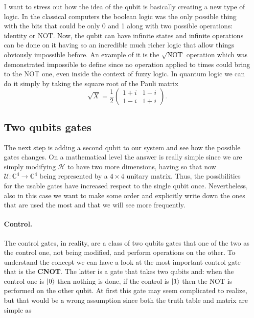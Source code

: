 \nt
{
    I want to stress out how the idea of the qubit is basically creating a new type of logic. In the classical computers the boolean logic was the only possible thing with the bits that could be only 0 and 1 along with two possible operations: identity or NOT. Now, the qubit can have infinite states and infinite operations can be done on it having so an incredible much richer logic that allow things obviously impossible before. An example of it is the $\sqrt{\text{NOT}}$ operation which was demonstrated impossible to define since no operation applied to times could bring to the NOT one, even inside the context of fuzzy logic. In quantum logic we can do it simply by taking the square root of the Pauli matrix
    \begin{equation}
        \sqrt{X} = \frac{1}{2}\begin{pmatrix}
            1+i & 1-i\\
            1-i & 1+i
        \end{pmatrix}.
    \end{equation}
}

\subsection{Two qubits gates}

The next step is adding a second qubit to our system and see how the possible gates changes. On a mathematical level the answer is really simple since we are simply modifying $\mathcal{H}$ to have two more dimensions, having so that now $\mathcal{U}: \mathbb{C}^{4}\to\mathbb{C}^4$ being represented by a $4\times 4$ unitary matrix. Thus, the possibilities for the usable gates have increased respect to the single qubit once. Nevertheless, also in this case we want to make some order and explicitly write down the ones that are used the most and that we will see more frequently.

\paragraph{Control.} The control gates, in reality, are a class of two qubits gates that one of the two as the control one, not being modified, and perform operations on the other. To understand the concept we can have a look at the most important control gate that is the \textbf{CNOT}. The latter is a gate that takes two qubits and: when the control one is $\ket{0}$ then nothing is done, if the control is $\ket{1}$ then the NOT is performed on the other qubit. At first this gate may seem complicated to realize, but that would be a wrong assumption since both the truth table and matrix are simple as

